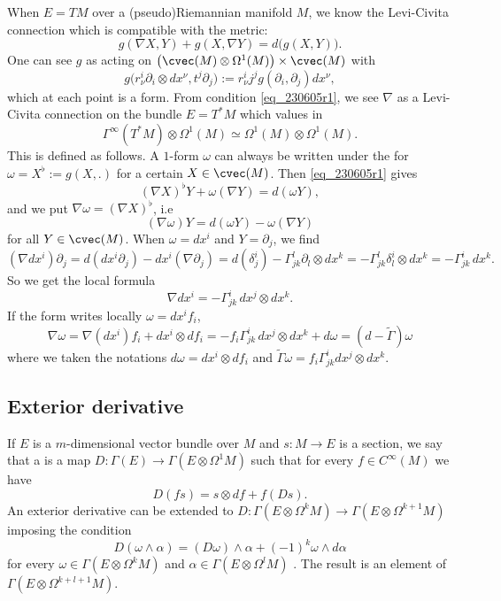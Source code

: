 When $E=TM$ over a (pseudo)Riemannian manifold $M$, we know the Levi-Civita connection which is compatible with the metric:
\begin{equation}\label{eq_230605r1}
  g(\nabla X,Y)+g(X,\nabla Y)=d\big( g(X,Y) \big).
\end{equation}
One can see $g$ as acting on $\big( \cvec(M)\otimes\Omega^1(M) \big)\times\cvec(M)$ with
\[
 g\big( r^i_{\nu}\partial_i\otimes dx^{\nu},t^j\partial_j \big):=r^i_{\nu}j^jg(\partial_i,\partial_j)dx^{\nu},
\]
which at each point is a form. From condition \eqref{eq_230605r1}, we see $\nabla$ as a Levi-Civita connection on the bundle $E=T^*M$ which values in
\[
 \Gamma^{\infty}(T^*M)\otimes\Omega^1(M)\simeq\Omega^1(M)\otimes\Omega^1(M).
\]
This is defined as follows. A $1$-form $\omega$ can always be written under the for $\omega=X^{\flat}:=g(X,.)$ for a certain $X\in\cvec(M)$. Then  \eqref{eq_230605r1} gives
\[
  (\nabla X)^{\flat}Y+\omega(\nabla Y)=d(\omega Y),
\]
and we put $\nabla\omega=(\nabla X)^{\flat}$, i.e
\begin{equation}
  (\nabla\omega)Y=d(\omega Y)-\omega(\nabla Y)
\end{equation}
for all $Y\in\cvec(M)$. When $\omega=dx^i$ and $Y=\partial_j$, we find
\begin{equation}
(\nabla dx^i)\partial_j=d(dx^i\partial_j)-dx^i(\nabla\partial_j)
		=d(\delta^i_j)-\Gamma_{jk}^{l}\partial_l\otimes dx^k
		=-\Gamma_{jk}^{l}\delta_l^i\otimes dx^k
		=-\Gamma_{jk}^{i}\,dx^k.
\end{equation}
So we get the local formula
\begin{equation}
\nabla dx^i=-\Gamma_{jk}^{i}\,dx^j\otimes dx^k.
\end{equation}
If the form writes locally $\omega=dx^if_i$,
\begin{equation}
  \nabla\omega=\nabla(dx^i)f_i+dx^i\otimes df_i
		=-f_i\Gamma_{jk}^{i}\,dx^j\otimes dx^k+d\omega
		=(d-\tilde\Gamma)\omega
\end{equation}
where we taken the notations $d\omega=dx^i\otimes df_i$ and $\tilde\Gamma\omega=f_i\Gamma_{jk}^{i}dx^j\otimes dx^k$.

\subsection{Exterior derivative}

If $E$ is a $m$-dimensional vector bundle over $M$ and $s\colon M\to E$ is a section, we say that a  is a map $D\colon \Gamma(E)\to \Gamma(E\otimes \Omega^1M)$ such that for every $f\in C^{\infty}(M)$ we have
\[
  D(fs)=s\otimes df+f(Ds).
\]
An exterior derivative can be extended to $D\colon \Gamma(E\otimes\Omega^kM)\to \Gamma(E\otimes\Omega^{k+1}M)$ imposing the condition
\begin{equation}		\label{EqExtExtDerrk}
D(\omega\wedge\alpha)=(D\omega)\wedge\alpha+(-1)^k\omega\wedge d\alpha
\end{equation}
for every $\omega\in\Gamma(E\otimes\Omega^kM)$ and $\alpha\in\Gamma(E\otimes\Omega^lM)$ . The result is an element of $\Gamma(E\otimes\Omega^{k+l+1}M)$.

